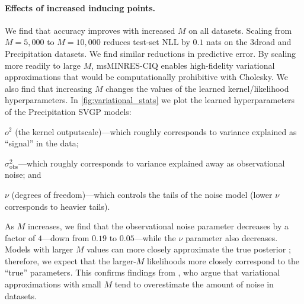 \paragraph{Effects of increased inducing points.}
We find that accuracy improves with increased $M$ on all datasets.
Scaling from $M=5,\!000$ to $M=10,\!000$ reduces test-set NLL by $0.1$ nats on the 3droad and Precipitation datasets.
We find similar reductions in predictive error.
By scaling more readily to large $M$, msMINRES-CIQ enables high-fidelity variational approximations that would be computationally prohibitive with Cholesky.
We also find that increasing $M$ changes the values of the learned kernel/likelihood hyperparameters.
In \cref{fig:variational_stats} we plot the learned hyperparameters of the Precipitation SVGP models:
%
\begin{enumerate*}
  \item $o^2$ (the kernel outputscale)---which roughly corresponds to variance explained as ``signal'' in the data;
  \item $\sigma^2_\text{obs}$---which roughly corresponds to variance explained away as observational noise; and
  \item $\nu$ (degrees of freedom)---which controls the tails of the noise model (lower $\nu$ corresponds to heavier tails).
\end{enumerate*}
%
As $M$ increases, we find that the observational noise parameter decreases by a factor of $4$---down from $0.19$ to $0.05$---while the $\nu$ parameter also decreases.
Models with larger $M$ values can more closely approximate the true posterior \cite{hensman2013gaussian}; therefore, we expect that the larger-$M$ likelihoods more closely correspond to the ``true'' parameters.
This confirms findings from \citet{bauer2016understanding}, who argue that variational approximations with small $M$ tend to overestimate the amount of noise in datasets.
